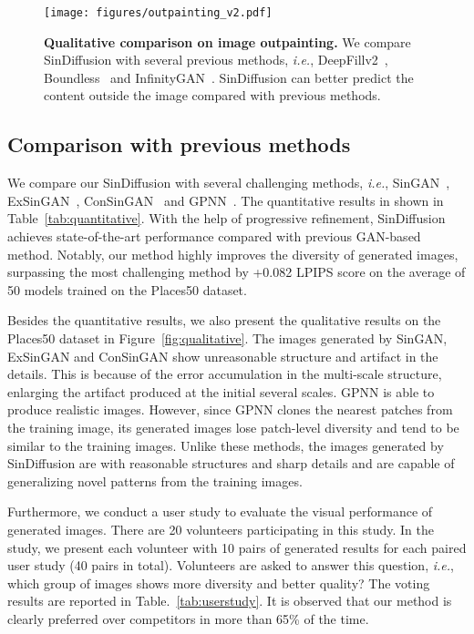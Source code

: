 \documentclass[10pt,twocolumn,letterpaper]{article}
\begin{document}
\begin{figure*}[t]
  \centering
   \texttt{[image: figures/outpainting\_v2.pdf]}
   \vspace{-7mm}
   \caption{
   \textbf{Qualitative comparison on image outpainting.}
   We compare SinDiffusion with several previous methods, \emph{i.e.}, DeepFillv2~\cite{yu2019free}, Boundless~\cite{teterwak2019boundless} and InfinityGAN~\cite{lin2021infinitygan}.
   SinDiffusion can better predict the content outside the image compared with previous methods.
   }
   \vspace{-6mm}
   \label{fig:outpaint}
\end{figure*}

\subsection{Comparison with previous methods}
We compare our SinDiffusion with several challenging methods, \emph{i.e.}, SinGAN~\cite{shaham2019singan}, ExSinGAN~\cite{zhang2021exsingan}, ConSinGAN~\cite{hinz2021improved} and GPNN~\cite{granot2022drop}.
The quantitative results in shown in Table~\ref{tab:quantitative}.
With the help of progressive refinement, SinDiffusion achieves state-of-the-art performance compared with previous GAN-based method.
Notably, our method highly improves the diversity of generated images, surpassing the most challenging method by +0.082 LPIPS score on the average of 50 models trained on the Places50 dataset.

Besides the quantitative results, we also present the qualitative results on the Places50 dataset in Figure~\ref{fig:qualitative}.
The images generated by SinGAN, ExSinGAN and ConSinGAN show unreasonable structure and artifact in the details.
This is because of the error accumulation in the multi-scale structure, enlarging the artifact produced at the initial several scales.
GPNN is able to produce realistic images.
However, since GPNN clones the nearest patches from the training image, its generated images lose patch-level diversity and tend to be similar to the training images.
Unlike these methods, the images generated by SinDiffusion are with reasonable structures and sharp details and are capable of generalizing novel patterns from the training images.

Furthermore, we conduct a user study to evaluate the visual performance of generated images.
There are 20 volunteers participating in this study.
In the study, we present each volunteer with 10 pairs of generated results for each paired user study (40 pairs in total).
Volunteers are asked to answer this question, \emph{i.e.}, which group of images shows more diversity and better quality?
The voting results are reported in Table.~\ref{tab:userstudy}.
It is observed that our method is clearly preferred over competitors in more than 65\% of the time.
\end{document}
